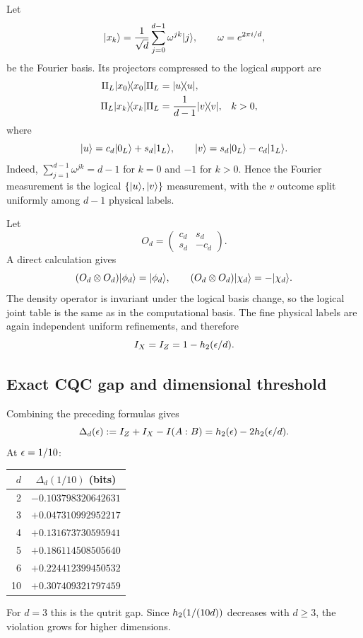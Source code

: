 Let
\begin{equation}
\lvert x_k\rangle=\frac{1}{\sqrt d}\sum_{j=0}^{d-1}\omega^{jk}\lvert j\rangle,
\qquad \omega=e^{2\pi i/d},
\end{equation}
be the Fourier basis. Its projectors compressed to the logical support are
\begin{align}
\Pi_L\lvert x_0\rangle\!\langle x_0\rvert\Pi_L&=\lvert u\rangle\!\langle u\rvert,\\
\Pi_L\lvert x_k\rangle\!\langle x_k\rvert\Pi_L&=\frac{1}{d-1}\lvert v\rangle\!\langle v\rvert, && k>0,
\end{align}
where
\begin{equation}
\lvert u\rangle=c_d\lvert 0_L\rangle+s_d\lvert 1_L\rangle,
\qquad
\lvert v\rangle=s_d\lvert 0_L\rangle-c_d\lvert 1_L\rangle.
\end{equation}
Indeed, $\sum_{j=1}^{d-1}\omega^{jk}=d-1$ for $k=0$ and $-1$ for $k>0$. Hence the Fourier measurement is the logical $\{\lvert u\rangle,\lvert v\rangle\}$ measurement, with the $v$ outcome split uniformly among $d-1$ physical labels.

Let
\begin{equation}
O_d=\begin{pmatrix}c_d&s_d\\s_d&-c_d\end{pmatrix}.
\end{equation}
A direct calculation gives
\begin{equation}
(O_d\otimes O_d)\lvert \phi_d\rangle=\lvert \phi_d\rangle,
\qquad
(O_d\otimes O_d)\lvert \chi_d\rangle=-\lvert \chi_d\rangle.
\end{equation}
The density operator is invariant under the logical basis change, so the logical joint table is the same as in the computational basis. The fine physical labels are again independent uniform refinements, and therefore
\begin{equation}
I_X=I_Z=1-h_2(\epsilon/d).
\end{equation}

\subsection{Exact CQC gap and dimensional threshold}

Combining the preceding formulas gives
\begin{equation}
\Delta_d(\epsilon):=I_Z+I_X-I(A:B)=h_2(\epsilon)-2h_2(\epsilon/d).
\end{equation}
At $\epsilon=1/10$:
\begin{center}
\begin{tabular}{@{}rc@{}}
\toprule
$d$ & $\Delta_d(1/10)$ (bits)\\
\midrule
2 & $-0.103798320642631$\\
3 & $+0.047310992952217$\\
4 & $+0.131673730595941$\\
5 & $+0.186114508505640$\\
6 & $+0.224412399450532$\\
10 & $+0.307409321797459$\\
\bottomrule
\end{tabular}
\end{center}
For $d=3$ this is the qutrit gap. Since $h_2(1/(10d))$ decreases with $d\ge3$, the violation grows for higher dimensions.

